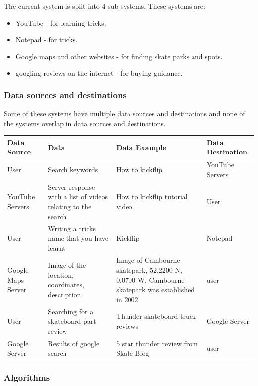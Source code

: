 The current system is split into 4 sub systems. These systems are: 
\begin{itemize}
\item YouTube - for learning tricks.
\item Notepad - for tricks. 
\item Google maps and other websites - for finding skate parks and spots. 
\item googling reviews on the internet - for buying guidance.
\end{itemize}



\subsubsection{Data sources and destinations}

Some of these systems have multiple data sources and destinations and none of the systems overlap in data sources and destinations. 

\begin{center}
\begin{tabular}{|p{2cm}|p{3cm}|p{3cm}|p{3cm}|}
    \hline
 \textbf{Data Source} & \textbf{Data} & \textbf{Data Example} & \textbf{Data Destination}\\ \hline
User & Search keywords & How to kickflip & YouTube Servers \\ \hline
YouTube Servers & Server response with a list of videos relating to the search & How to kickflip tutorial video & User \\ \hline
User & Writing a tricks name that you have learnt & Kickflip & Notepad \\ \hline
Google Maps Server & Image of the location, coordinates, description & Image of Cambourne skatepark, 52.2200 N, 0.0700 W, Cambourne skatepark was established in 2002 & user \\ \hline
User & Searching for a skateboard part review & Thunder skateboard truck reviews & Google Server \\ \hline
Google Server & Results of google search & 5 star thunder review from Skate Blog & user \\ \hline 
\end{tabular}
\label{Data Source and Destinations}
\end{center}


\subsubsection{Algorithms}


